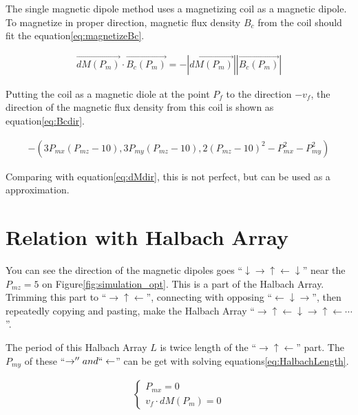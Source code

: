 \documentclass[dvipdfmx]{article}
\begin{document}
The single magnetic dipole method uses a magnetizing coil as a magnetic dipole.
To magnetize in proper direction, magnetic flux density $B_{c}$ from the coil should fit the equation\ref{eq:magnetizeBc}.

\begin{eqnarray}
	\overrightarrow{dM(P_{m})} \cdot \overrightarrow{B_{c}(P_{m})} = - \left| \overrightarrow{dM(P_{m})} \right| \left| \overrightarrow{B_{c}(P_{m})} \right|
	\label{eq:magnetizeBc}
\end{eqnarray}

Putting the coil as a magnetic diole at the point $P_{f}$ to the direction $-v_{f}$,
the direction of the magnetic flux density from this coil is shown as equation\ref{eq:Bcdir}.

\begin{eqnarray}
	-\left( 3P_{mx}(P_{mz}-10), 3P_{my}(P_{mz}-10), 2(P_{mz}-10)^2 - P_{mx}^2 - P_{my}^2 \right)
	\label{eq:Bcdir}
\end{eqnarray}

Comparing with equation\ref{eq:dMdir}, this is not perfect, but can be used as a approximation.


\section{Relation with Halbach Array}

You can see the direction of the magnetic dipoles goes ``$\downarrow\rightarrow\uparrow\leftarrow\downarrow$''
 near the $P_{mz}=5$ on Figure\ref{fig:simulation_opt}.
This is a part of the Halbach Array.
Trimming this part to ``$\rightarrow\uparrow\leftarrow$'', connecting with opposing ``$\leftarrow\downarrow\rightarrow$'',
 then repeatedly copying and pasting, make the Halbach Array
 ``$\rightarrow\uparrow\leftarrow\downarrow\rightarrow\uparrow\leftarrow\cdots$''.

The period of this Halbach Array $L$ is twice length of the ``$\rightarrow\uparrow\leftarrow$'' part.
The $P_{my}$ of these ``$\rightarrow'' and ``\leftarrow$'' can be get with solving equations\ref{eq:HalbachLength}.

\begin{eqnarray}
  \left\{
    \begin{array}{l}
      P_{mx} = 0 \\
      v_{f} \cdot dM(P_{m}) = 0
    \end{array}
  \right.
  \label{eq:HalbachLength}
\end{eqnarray}
\end{document}
